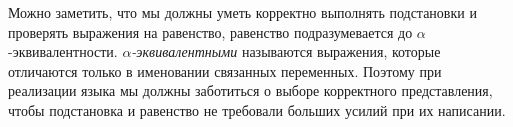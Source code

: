 Можно заметить, что мы должны уметь корректно выполнять подстановки и проверять выражения на равенство, равенство подразумевается до $\alpha$-эквивалентности. \textit{$\alpha$-эквивалентными} называются выражения, которые отличаются только в именовании связанных переменных. Поэтому при реализации языка мы должны заботиться о выборе корректного представления, чтобы подстановка и равенство не требовали больших усилий при их написании.





